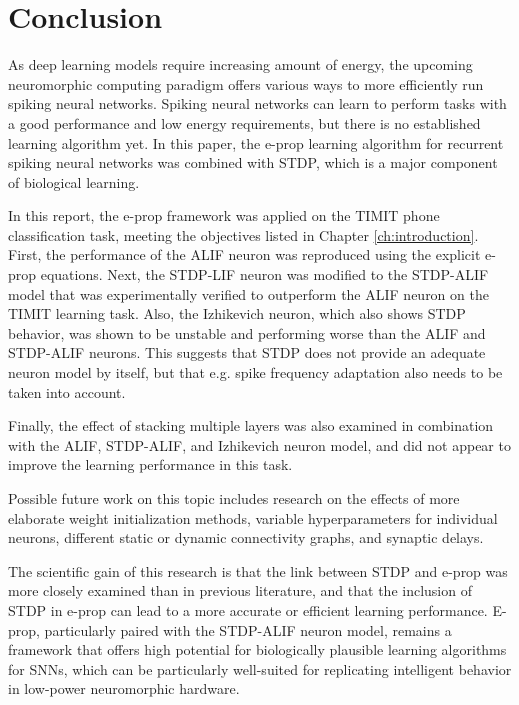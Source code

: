 \chapter{Conclusion}\label{ch:conclusion}

As deep learning models require increasing amount of energy, the upcoming neuromorphic computing paradigm offers various ways to more efficiently run spiking neural networks.
Spiking neural networks can learn to perform tasks with a good performance and low energy requirements, but there is no established learning algorithm yet.
In this paper, the e-prop learning algorithm for recurrent spiking neural networks was combined with STDP, which is a major component of biological learning.

In this report, the e-prop framework was applied on the TIMIT phone classification task, meeting the objectives listed in Chapter \ref{ch:introduction}.
First, the performance of the ALIF neuron was reproduced using the explicit e-prop equations.
Next, the STDP-LIF neuron was modified to the STDP-ALIF model that was experimentally verified to outperform the ALIF neuron on the TIMIT learning task.
Also, the Izhikevich neuron, which also shows STDP behavior, was shown to be unstable and performing worse than the ALIF and STDP-ALIF neurons.
This suggests that STDP does not provide an adequate neuron model by itself, but that e.g. spike frequency adaptation also needs to be taken into account.

Finally, the effect of stacking multiple layers was also examined in combination with the ALIF, STDP-ALIF, and Izhikevich neuron model, and did not appear to improve the learning performance in this task.

Possible future work on this topic includes research on the effects of more elaborate weight initialization methods, variable hyperparameters for individual neurons, different static or dynamic connectivity graphs, and synaptic delays.

The scientific gain of this research is that the link between STDP and e-prop was more closely examined than in previous literature, and that the inclusion of STDP in e-prop can lead to a more accurate or efficient learning performance.
E-prop, particularly paired with the STDP-ALIF neuron model, remains a framework that offers high potential for biologically plausible learning algorithms for SNNs, which can be particularly well-suited for replicating intelligent behavior in low-power neuromorphic hardware.

